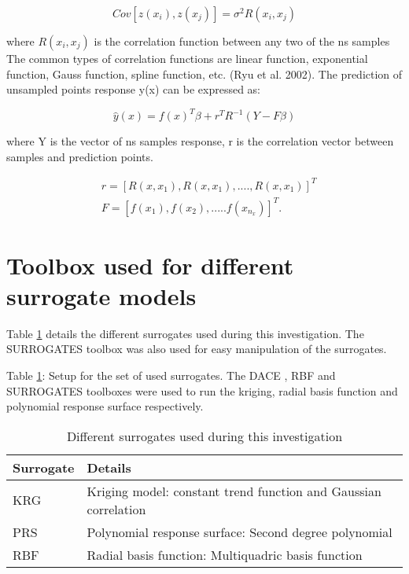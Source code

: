 \begin{equation}
Cov[z(x_{i}),z(x_{j})] = \sigma ^{2} R (x_{i},x_{j})
\end{equation}

where $ R (x_{i},x_{j}) $  is the correlation function between any two of the ns samples The common types of correlation functions are linear function, exponential function, Gauss function, spline function, etc. (Ryu et al. 2002). 
The prediction of unsampled points response y(x) can be expressed as:

\begin{equation}
\hat{y}(x) = f(x)^{T} \beta + r^{T} R^{-1} (Y - F \beta )
\end{equation}

where Y is the vector of ns samples response, r is the correlation vector between samples and prediction points.


\begin{eqnarray}
& r = [R(x,x_{1}),R(x,x_{1}),....,R(x,x_{1}) ]^{T} \\
& F = [f(x_{1}), f(x_{2}),.....f(x_{n_{x}}) ]^{T} .
\end{eqnarray}

\section{Toolbox used for different surrogate models}

Table \ref{Different surrogates used during this investigation} details the different surrogates used during this investigation. The SURROGATES toolbox was also used for easy manipulation of the surrogates.

Table \ref{Different surrogates used during this investigation}: Setup for the set of used surrogates. The  DACE , RBF  and SURROGATES  toolboxes were used to run the kriging, radial basis function and polynomial response surface respectively.

\begin{table}[H]
	\centering
	\caption{Different surrogates used during this investigation}
	\label{Different surrogates used during this investigation}
	\begin{tabular}{ll}
		\hline \hline
		Surrogate & Details    \\ \hline \hline
		 KRG	 & Kriging model: constant trend function and Gaussian correlation \\
		 PRS & Polynomial response surface: Second degree polynomial \\
		 RBF  & Radial basis function: Multiquadric basis function \\
		 \hline \hline
	\end{tabular}
\end{table}






